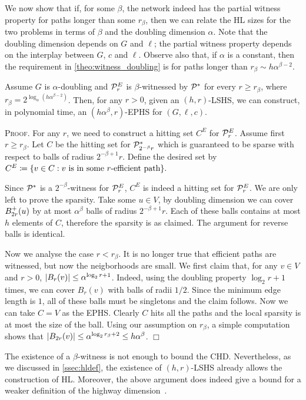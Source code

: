 \documentclass[opre,nonblindrev]{informs3} %
\renewenvironment{proof}[1][\textsc{Proof.}]{#1 }{\hfill $\Box$}
\begin{document}
We now show that if, for some $\beta$, the network indeed has the partial witness property for paths longer than some $r_\beta$, then we can relate the HL sizes for the two problems in terms of $\beta$ and the doubling dimension $\alpha$. 
Note that the doubling dimension depends on $G$ and $\ell$; the partial witness property depends on the interplay between $G$, $c$ and $\ell$.
Observe also that, if $\alpha$ is a constant, then the requirement in \cref{theo:witness_doubling} is for paths longer than $r_\beta\sim h\alpha^{\beta-2}$.
\begin{theorem}\label{theo:witness_doubling}
Assume $G$ is $\alpha$-doubling and $\mathcal{P}^E_r$ is $\beta$-witnessed by $\mathcal{P}^*$ for every $r\geq r_\beta$, where $r_\beta=2^{\log_\alpha(h\alpha^{\beta-2})}$. 
Then, for any $r>0$, given an $(h,r)$-LSHS, we can construct, in polynomial time, an $(h\alpha^{\beta},r)$-EPHS for $(G,\ell,c)$.
\end{theorem}

\begin{proof}
For any $r$, we need to construct a hitting set $C^E$ for $\mathcal{P}^E_r$.
Assume first $r\geq r_\beta$.
Let $C$ be the hitting set for $\mathcal{P}^*_{2^{-\beta}r}$ which is guaranteed to be sparse with respect to balls of radius $2^{-\beta+1}r$.
Define the desired set by
$
C^E\coloneqq\{v\in C: v \text{ is in some $r$-efficient path} \}.
$

Since $\mathcal{P}^*$ is a $2^{-\beta}$-witness for $\mathcal{P}^E_r$, $C^E$ is indeed a hitting set for $\mathcal{P}^E_r$.
We are only left to prove the sparsity.
Take some $u\in V$, by doubling dimension we can cover $B^+_{2r}(u)$ by at most $\alpha^\beta$ balls of radius $2^{-\beta+1}r$.
Each of these balls contains at most $h$ elements of $C$, therefore the sparsity is as claimed.
The argument for reverse balls is identical.

Now we analyse the case $r< r_\beta$.
It is no longer true that efficient paths are witnessed, but now the neigborhoods are small.
We first claim that, for any $v\in V$ and $r>0$, $\lvert B_{r}(v)\rvert\leq \alpha^{\log_2r+1}$.
Indeed, using the doubling property $\log_2r+1$ times, we can cover $B_r(v)$ with balls of radii $1/2$.
Since the minimum edge length is $1$, all of these balls must be singletons and the claim follows.
Now we can take $C=V$ as the EPHS.
Clearly $C$ hits all the paths and the local sparsity is at most the size of the ball.
Using our assumption on $r_\beta$, a simple computation shows that $\lvert B_{2r}(v)\rvert\leq \alpha^{\log_2r_\beta+2}\leq h\alpha^\beta$. 
\end{proof}
\begin{remark}
The existence of a $\beta$-witness is not enough to bound the CHD. 
Nevertheless, as we discussed in \cref{ssec:hldef}, the existence of $(h,r)$-LSHS already allows the construction of HL. Moreover, the above argument does indeed give a bound for a weaker definition of the highway dimension~\cite{highway2010}.
\end{remark}
\end{document}
